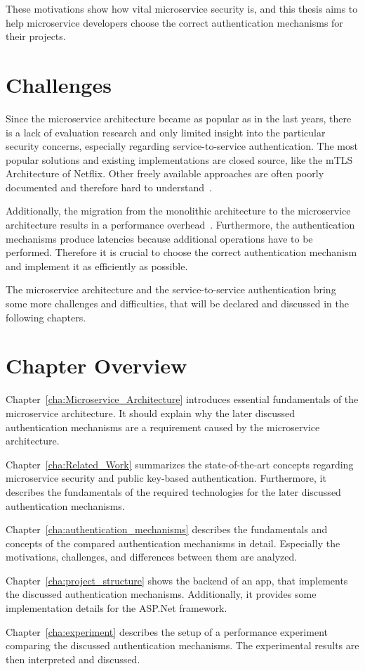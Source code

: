 These motivations show how vital microservice security is, and this thesis aims to help microservice developers choose the correct authentication mechanisms for their projects.

\section{Challenges}
Since the microservice architecture became as popular as in the last years, there is a lack of evaluation research and only limited insight into the particular security concerns, especially regarding service-to-service authentication. 
The most popular solutions and existing implementations are closed source, like the mTLS Architecture of Netflix.
Other freely available approaches are often poorly documented and therefore hard to understand~\cite{yarygina2018overcoming}.

Additionally, the migration from the monolithic architecture to the microservice architecture results in a performance overhead~\cite{ueda2016workload}.
Furthermore, the authentication mechanisms produce latencies because additional operations have to be performed.
Therefore it is crucial to choose the correct authentication mechanism and implement it as efficiently as possible.

The microservice architecture and the service-to-service authentication bring some more challenges and difficulties, that will be declared and discussed in the following chapters.

\section{Chapter Overview}
Chapter~\ref{cha:Microservice_Architecture} introduces essential fundamentals of the microservice architecture. 
It should explain why the later discussed authentication mechanisms are a requirement caused by the microservice architecture.

\noindent Chapter~\ref{cha:Related_Work} summarizes the state-of-the-art concepts regarding microservice security and public key-based authentication.
Furthermore, it describes the fundamentals of the required technologies for the later discussed authentication mechanisms.

\noindent Chapter~\ref{cha:authentication_mechanisms} describes the fundamentals and concepts of the compared authentication mechanisms in detail.
Especially the motivations, challenges, and differences between them are analyzed.

\noindent Chapter~\ref{cha:project_structure} shows the backend of an app, that implements the discussed authentication mechanisms.
Additionally, it provides some implementation details for the ASP.Net framework.

\noindent Chapter~\ref{cha:experiment} describes the setup of a performance experiment comparing the discussed authentication mechanisms.
The experimental results are then interpreted and discussed.
